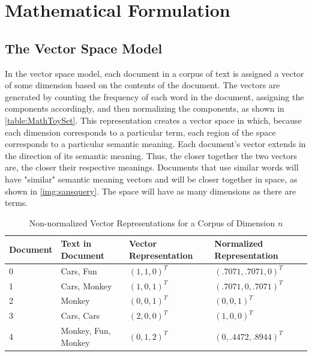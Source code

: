 \section{Mathematical Formulation} \label{sec:mathForm}
\subsection{The Vector Space Model}\label{subsec:vectorspacemodel}

In the vector space model, each document in a corpus of text is assigned a vector of some dimension based on the contents of the document. 
The vectors are generated by counting the frequency of each word in the document, assigning the components accordingly, and then normalizing the components, as shown in \autoref{table:MathToySet}. 
This representation creates a vector space in which, because each dimension corresponds to a particular term, each region of the space corresponds to a particular semantic meaning. Each document's vector extends in the direction of its semantic meaning. Thus, the closer together the two vectors are, the closer their respective meanings.
Documents that use similar words will have "similar" semantic meaning vectors and will be closer together in space, as shown in \autoref{img:sansquery}. The space will have as many dimensions as there are terms. 

\begin{center}
\begin{table}[h]
\begin{tabular}{| l | l | l | l |}
\hline
\textbf{Document} & \textbf{Text in Document} & \textbf{Vector Representation} & \textbf{Normalized Representation} \\ \hline
0        & Cars, Fun        & \((1, 1, 0)^T\) & \((.7071, .7071, 0)^T\) \\ \hline
1        & Cars, Monkey     & \((1, 0, 1)^T\) & \((.7071, 0, .7071)^T\) \\ \hline
2        & Monkey           & \((0, 0, 1)^T\) & \((0, 0, 1)^T\) \\ \hline
3        & Cars, Cars       & \((2, 0, 0)^T\) & \((1, 0, 0)^T\) \\ \hline
4        & Monkey, Fun, Monkey       & \((0, 1, 2)^T\) & \((0, .4472, .8944)^T\) \\ \hline
\end{tabular}
\caption{Non-normalized Vector Representations for a Corpus of Dimension $n$}
\label{table:MathToySet}
\vspace{-12mm}
\end{table}
\end{center}

